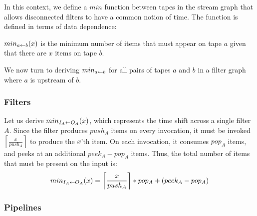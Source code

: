 In this context, we define a $min$ function between tapes in the
stream graph that allows disconnected filters to have a common notion
of time.  The function is defined in terms of data dependence:
\begin{definition}
$min_{a \leftarrow b}(x)$ is the minimum number of items that must appear on tape
$a$ given that there are $x$ items on tape $b$.
\end{definition}

We now turn to deriving $min_{a \leftarrow b}$ for all pairs of tapes $a$ and $b$
in a filter graph where $a$ is upstream of $b$.

\subsubsection{Filters}

Let us derive $min_{I_A \leftarrow O_A}(x)$, which represents the time shift
across a single filter $A$.  Since the filter produces $push_A$ items
on every invocation, it must be invoked
$\left\lceil\frac{x}{push_A}\right\rceil$ to produce the $x$'th item.
On each invocation, it consumes $pop_A$ items, and peeks at an
additional $peek_A-pop_A$ items.  Thus, the total number of items that
must be present on the input is:
\begin{align*}
min_{I_A \leftarrow O_A}(x) = \left\lceil\frac{x}{push_A}\right\rceil*pop_A+(peek_A-pop_A)
\end{align*}

\subsubsection{Pipelines}
\label{sec:timepipe}

